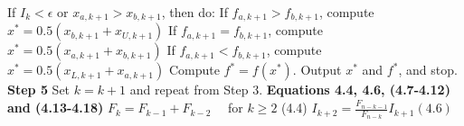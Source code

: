 \begin{multicols}{3}
If $I_k < \epsilon$ or $x_{a,k+1} > x_{b,k+1}$, then do: \newline
If $f_{a,k+1} > f_{b,k+1}$, compute
$x^* = 0.5(x_{b,k+1} + x_{U,k+1})$ \newline
If $f_{a,k+1} = f_{b,k+1}$, compute
$x^* = 0.5(x_{a,k+1} + x_{b,k+1})$ \newline
If $f_{a,k+1} < f_{b,k+1}$, compute
$x^* = 0.5(x_{L,k+1} + x_{a,k+1})$
Compute $f^* = f(x^*).$ \newline
Output $x^*$ and $f^*$, and stop. \newline
\textbf{Step 5} \newline
Set $k = k + 1$ and repeat from Step 3. \newline \newline 
\textbf{Equations 4.4, 4.6, (4.7-4.12) and (4.13-4.18) } \newline
$F_k = F_{k-1} + F_{k-2} \quad$ for $k \geq 2$ (4.4) \newline
$I_{k+2} = \frac{F_{n-k-1}}{F_{n-k}}I_{k+1} (4.6)$


\end{multicols}
